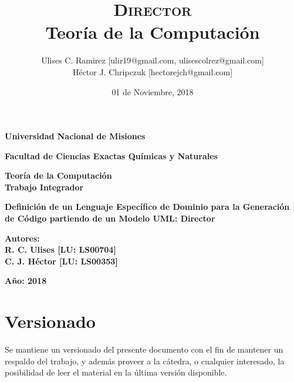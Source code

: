 \documentclass{report}
\title{\textsc{Director}\\Teoría de la Computación}
\author{Ulises C. Ramirez [ulir19@gmail.com, ulisescolrez@gmail.com]\\Héctor J.
Chripczuk [hectorejch@gmail.com]}
\date{01 de Noviembre, 2018}
\begin{document}
\maketitle
{}
\newpage

\begin{titlepage}
	\fontsize{14pt}{14pt} \selectfont
	\begin{center}{\bfseries Universidad Nacional de Misiones}\end{center}
	\vspace*{1\baselineskip}
	\begin{center}{\bfseries Facultad de Ciencias Exactas Químicas y
	Naturales}\end{center}
	\vspace*{2\baselineskip}
	\fontsize{16pt}{16pt} \selectfont
	\begin{center}{\bfseries {Teoría de la Computación\\Trabajo Integrador}}\end{center}
	\vspace*{2\baselineskip}
	\fontsize{18pt}{18pt} \selectfont
	\begin{center}{\bfseries Definición de un Lenguaje Específico de Dominio
	para la Generación de Código partiendo de un Modelo UML: Director}\end{center}
	\vspace*{2\baselineskip}
	\fontsize{16pt}{16pt} \selectfont
	\begin{center}{\bfseries Autores:\\R. C. Ulises [LU: LS00704]\\C. J. Héctor [LU: LS00353]}\end{center}
	\vspace*{\baselineskip}
	\fontsize{16pt}{16pt} \selectfont
	\begin{center}{}\end{center}
	\vspace*{2\baselineskip}
	\fontsize{16pt}{16pt} \selectfont
	\begin{center}{\bfseries Año: 2018}\end{center}
\end{titlepage}

\newpage
\section*{Versionado}
Se mantiene un versionado del presente documento con el fin de mantener un
respaldo del trabajo, y además proveer a la cátedra, o cualquier interesado, la
posibilidad de leer el material en la última versión disponible.
\end{document}

